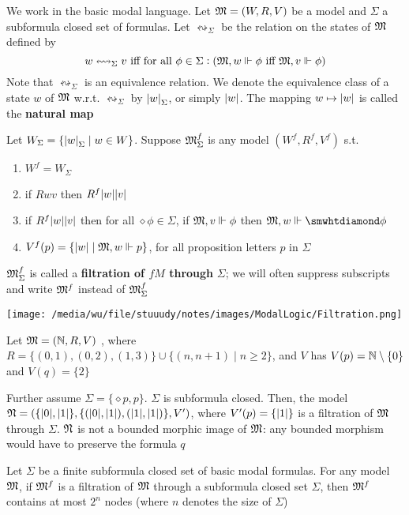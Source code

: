 \documentclass[11pt]{article}
\begin{document}
\begin{definition}[Filtrations]
We work in the basic modal language. Let \(\mathfrak{M}=(W,R,V)\) be a model and \(\Sigma\) a
subformula closed set of formulas. Let \(\leftrightsquigarrow_\Sigma\) be
the relation on the states of \(\mathfrak{M}\) defined by
\begin{equation*}
w\leftrightsquigarrow_\Sigma v \text{ iff for all }\phi\in\Sigma:
(\mathfrak{M},w\Vdash\phi\text{ iff }\mathfrak{M},v\Vdash\phi)
\end{equation*}
Note that \(\leftrightsquigarrow_\Sigma\) is an equivalence relation. We
denote the equivalence class of a state \(w\) of \(\mathfrak{M}\) w.r.t.
\(\leftrightsquigarrow_\Sigma\) by \(\abs{w}_\Sigma\), or simply
\(\abs{w}\). The mapping \(w\mapsto\abs{w}\) is called the \textbf{natural map}

Let \(W_\Sigma=\{\abs{w}_\Sigma\mid w\in W\}\). Suppose \(\mathfrak{M}_\Sigma^f\) is
any model \((W^f,R^f,V^f)\) s.t.
\begin{enumerate}
\item \(W^f=W_\Sigma\)
\item if \(Rwv\) then \(R^f\abs{w}\abs{v}\)
\item if \(R^f\abs{w}\abs{v}\) then for all \(\diamond\phi\in\Sigma\), if
\(\mathfrak{M},v\Vdash\phi\) then \(\fM,w\Vdash\diamond\phi\)
\item \(V^f(p)=\{\abs{w}\mid\fM,w\Vdash p\}\), for all proposition letters
\(p\) in \(\Sigma\)
\end{enumerate}


\(\mathfrak{M}_\Sigma^f\) is called a \textbf{filtration of \(fM\) through} \(\Sigma\); we will
often suppress subscripts and write \(\mathfrak{M}^f\) instead of \(\mathfrak{M}_\Sigma^f\)
\end{definition}
\label{def2.36}
\begin{center}
\texttt{[image: /media/wu/file/stuuudy/notes/images/ModalLogic/Filtration.png]}
\end{center}

Let \(\mathfrak{M}=(\mathbb{N},R,V)\) , where \(R=\{(0,1),(0,2),(1,3)\}\cup\{(n,n+1)\mid
    n\ge2\}\), and \(V\) has \(V(p)=\mathbb{N}\setminus\{0\}\) and \(V(q)=\{2\}\)

Further assume \(\Sigma=\{\diamond p,p\}\). \(\Sigma\) is subformula closed. Then,
the model
\(\fN=(\{\abs{0},\abs{1}\},\{(\abs{0},\abs{1}),(\abs{1},\abs{1})\},V')\),
where \(V'(p)=\{\abs{1}\}\) is a filtration of \(\mathfrak{M}\) through \(\Sigma\). \(\mathfrak{N}\) is
not a bounded morphic image of \(\mathfrak{M}\): any bounded morphism would have to
preserve the formula \(q\)

\begin{proposition}[]
Let \(\Sigma\) be a finite subformula closed set of basic modal formulas. For any
model \(\mathfrak{M}\), if \(\mathfrak{M}^f\) is a filtration of \(\mathfrak{M}\) through a subformula
closed set \(\Sigma\), then \(\mathfrak{M}^f\) contains at most \(2^n\) nodes (where \(n\)
denotes the size of \(\Sigma\))
\end{proposition}
\end{document}
